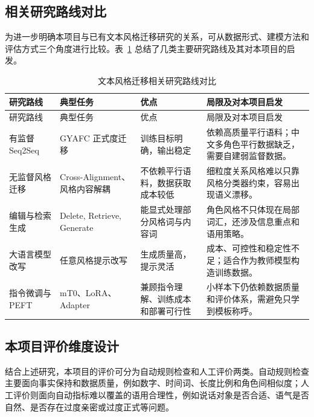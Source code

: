 \documentclass[12pt,a4paper]{ctexart}
\begin{document}
\subsection{相关研究路线对比}

为进一步明确本项目与已有文本风格迁移研究的关系，可从数据形式、建模方法和评估方式三个角度进行比较。表~\ref{tab:tst_compare} 总结了几类主要研究路线及其对本项目的启发。

\begin{longtable}{p{2.6cm}|p{3.1cm}|p{3.1cm}|p{3.4cm}}
\caption{文本风格迁移相关研究路线对比}
\label{tab:tst_compare}\\
\toprule
研究路线 & 典型任务 & 优点 & 局限及对本项目启发 \\
\midrule
\endfirsthead
\toprule
研究路线 & 典型任务 & 优点 & 局限及对本项目启发 \\
\midrule
\endhead
有监督 Seq2Seq & GYAFC 正式度迁移~\cite{rao2018gyafc} & 训练目标明确，输出稳定 & 依赖高质量平行语料；中文多角色平行数据缺乏，需要自建弱监督数据。 \\
无监督风格迁移 & Cross-Alignment、风格内容解耦~\cite{shen2017styletransfer,john2019} & 不依赖平行语料，数据获取成本较低 & 细粒度关系风格难以只靠风格分类器约束，容易出现语义漂移。 \\
编辑与检索生成 & Delete, Retrieve, Generate~\cite{li2018delete} & 能显式处理部分风格词与内容词 & 角色风格不只体现在局部词汇，还涉及信息重点和语用策略。 \\
大语言模型改写 & 任意风格提示改写~\cite{reif2022} & 生成质量高，提示灵活 & 成本、可控性和稳定性不足；适合作为教师模型构造训练数据。 \\
指令微调与 PEFT & mT0、LoRA、Adapter & 兼顾指令理解、训练成本和部署可行性 & 小样本下仍依赖数据质量和评价体系，需避免只学到模板称呼。 \\
\bottomrule
\end{longtable}

\subsection{本项目评价维度设计}

结合上述研究，本项目的评价可分为自动规则检查和人工评价两类。自动规则检查主要面向事实保持和数据质量，例如数字、时间词、长度比例和角色间相似度；人工评价则面向自动指标难以覆盖的语用合理性，例如说话对象是否合适、语气是否自然、是否存在过度亲密或过度正式等问题。
\end{document}
